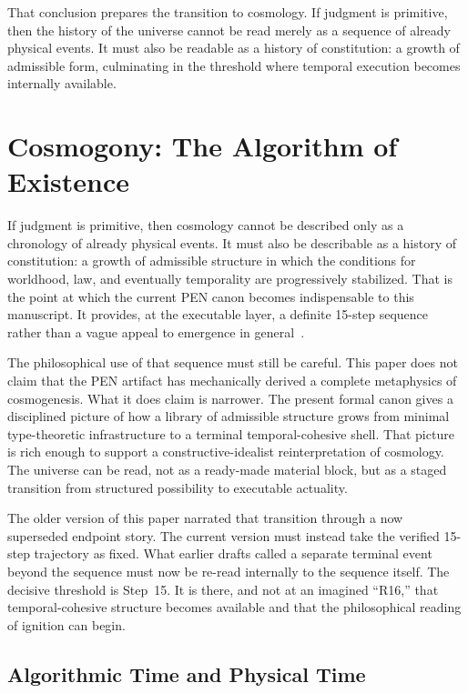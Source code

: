 \documentclass[11pt,a4paper]{article}
\theoremstyle{plain}
\theoremstyle{definition}
\theoremstyle{remark}
\begin{document}
That conclusion prepares the transition to cosmology.
If judgment is primitive, then the history of the universe cannot be read merely as a sequence of already physical events.
It must also be readable as a history of constitution: a growth of admissible form, culminating in the threshold where temporal execution becomes internally available.

\section{Cosmogony: The Algorithm of Existence}
\label{sec:cosmogony}

If judgment is primitive, then cosmology cannot be described only as a chronology of already physical events.
It must also be describable as a history of constitution: a growth of admissible structure in which the conditions for worldhood, law, and eventually temporality are progressively stabilized.
That is the point at which the current PEN canon becomes indispensable to this manuscript.
It provides, at the executable layer, a definite 15-step sequence rather than a vague appeal to emergence in general~\cite{pen}.

The philosophical use of that sequence must still be careful.
This paper does not claim that the PEN artifact has mechanically derived a complete metaphysics of cosmogenesis.
What it does claim is narrower.
The present formal canon gives a disciplined picture of how a library of admissible structure grows from minimal type-theoretic infrastructure to a terminal temporal-cohesive shell.
That picture is rich enough to support a constructive-idealist reinterpretation of cosmology.
The universe can be read, not as a ready-made material block, but as a staged transition from structured possibility to executable actuality.

The older version of this paper narrated that transition through a now superseded endpoint story.
The current version must instead take the verified 15-step trajectory as fixed.
What earlier drafts called a separate terminal event beyond the sequence must now be re-read internally to the sequence itself.
The decisive threshold is Step~15.
It is there, and not at an imagined ``R16,'' that temporal-cohesive structure becomes available and that the philosophical reading of ignition can begin.

\subsection{Algorithmic Time and Physical Time}
\label{subsec:two-times}
\end{document}
